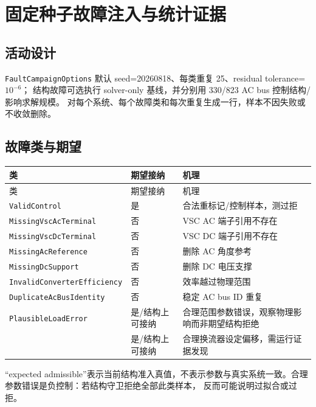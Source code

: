 \section{固定种子故障注入与统计证据}

\subsection{活动设计}

\texttt{FaultCampaignOptions} 默认 seed=20260818、每类重复 25、residual tolerance=$10^{-6}$；
结构故障可选执行 solver-only 基线，并分别用 330/823 AC bus 控制结构/影响求解规模。
 对每个系统、每个故障类和每次重复生成一行，样本不因失败或不收敛删除。

\subsection{故障类与期望}

\begin{center}\footnotesize
\begin{longtable}{@{}L{5.0cm}L{3.2cm}L{7.0cm}@{}}
\toprule 类 & 期望接纳 & 机理\\\midrule
\endfirsthead
\toprule 类 & 期望接纳 & 机理\\\midrule\endhead
\texttt{ValidControl} & 是 & 合法重标记/控制样本，测过拒\\
\texttt{MissingVscAcTerminal} & 否 & VSC AC 端子引用不存在\\
\texttt{MissingVscDcTerminal} & 否 & VSC DC 端子引用不存在\\
\texttt{MissingAcReference} & 否 & 删除 AC 角度参考\\
\texttt{MissingDcSupport} & 否 & 删除 DC 电压支撑\\
\texttt{InvalidConverterEfficiency} & 否 & 效率越过物理范围\\
\texttt{DuplicateAcBusIdentity} & 否 & 稳定 AC bus ID 重复\\
\texttt{PlausibleLoadError} & 是/结构上可接纳 & 合理范围参数错误，观察物理影响而非期望结构拒绝\\
{\ttfamily\scriptsize{}} & 是/结构上可接纳 & 合理换流器设定偏移，需运行证据发现\\
\bottomrule
\end{longtable}
\end{center}

“expected admissible”表示当前结构准入真值，不表示参数与真实系统一致。合理参数错误是负控制：若结构守卫拒绝全部此类样本，
反而可能说明过拟合或过拒。

